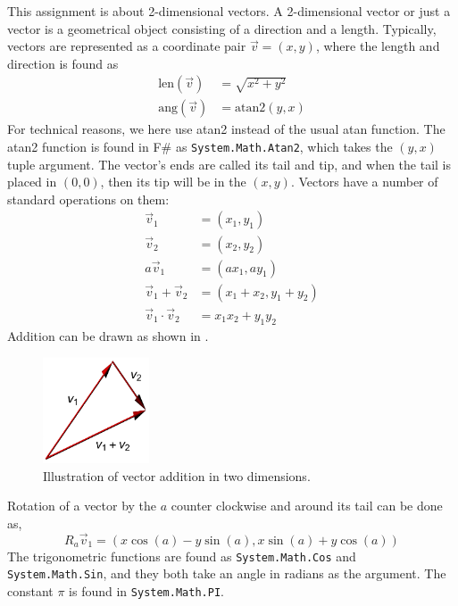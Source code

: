 This assignment is about 2-dimensional vectors. A 2-dimensional vector or just a vector is a geometrical object consisting of a direction and a length. Typically, vectors are represented as a coordinate pair $\vec v  = (x, y)$, where the length and direction is found as
\begin{align}
  \text{len}(\vec v) &= \sqrt{x^2+y^2}
  \\\text{ang}(\vec v) &=\text{atan2}(y, x)
\end{align}
For technical reasons, we here use atan2 instead of the usual atan function. The atan2 function is found in F\# as \lstinline{System.Math.Atan2}, which takes the $(y,x)$ tuple argument. The vector's ends are called its tail and tip, and when the tail is placed in $(0, 0)$, then its tip will be in the  $(x, y)$. Vectors have a number of standard operations on them:
\begin{align}
  \vec v_1 &= (x_1, y_1)
  \\\vec v_2 &= (x_2, y_2)
  \\a \vec v_1 &= (a x_1, a y_1)
  \\\vec v_1 + \vec v_2 &= (x_1+x_2, y_1+y_2)
  \\\vec v_1 \cdot \vec v_2 &= x_1 x_2 +  y_1y_2
\end{align}
Addition can be drawn as shown in .
\begin{figure}
  \centering
  \includegraphics[width=0.28\textwidth]{vectorAddition}
  \caption{Illustration of vector addition in two dimensions.}
  \label{fig:vectorAddition}
\end{figure}
Rotation of a vector by the $a$ counter clockwise and around its tail can be done as,
\begin{equation}
  R_a \vec v_1 = (x\cos(a) - y\sin(a),x\sin(a)+y\cos(a))
\end{equation}
The trigonometric functions are found as \lstinline{System.Math.Cos} and \lstinline{System.Math.Sin}, and they both take an angle in radians as the argument. The constant $\pi$ is found in \lstinline{System.Math.PI}.
